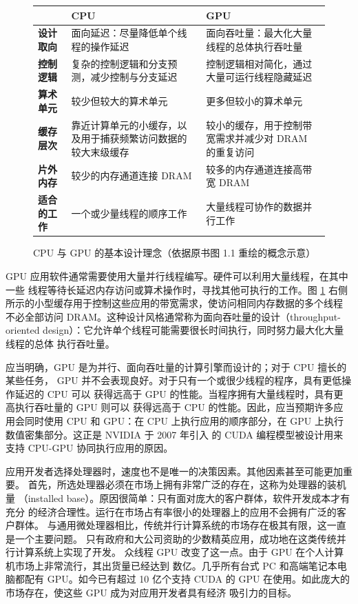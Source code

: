 \begin{figure}[htbp]
  \centering
  \small
  \renewcommand{\arraystretch}{1.35}
  \begin{tabularx}{0.95\textwidth}{%
    >{\raggedright\arraybackslash\bfseries}p{}
    >{\raggedright\arraybackslash}X
    >{\raggedright\arraybackslash}X}
    \toprule
    & CPU & GPU \\
    \midrule
    设计取向
      & 面向延迟：尽量降低单个线程的操作延迟
      & 面向吞吐量：最大化大量线程的总体执行吞吐量 \\
    控制逻辑
      & 复杂的控制逻辑和分支预测，减少控制与分支延迟
      & 控制逻辑相对简化，通过大量可运行线程隐藏延迟 \\
    算术单元
      & 较少但较大的算术单元
      & 更多但较小的算术单元 \\
    缓存层次
      & 靠近计算单元的小缓存，以及用于捕获频繁访问数据的较大末级缓存
      & 较小的缓存，用于控制带宽需求并减少对 DRAM 的重复访问 \\
    片外内存
      & 较少的内存通道连接 DRAM
      & 较多的内存通道连接高带宽 DRAM \\
    适合的工作
      & 一个或少量线程的顺序工作
      & 大量线程可协作的数据并行工作 \\
    \bottomrule
  \end{tabularx}
  \caption{CPU 与 GPU 的基本设计理念（依据原书图 1.1 重绘的概念示意）}
  \label{fig:1-1}
\end{figure}

GPU 应用软件通常需要使用大量并行线程编写。硬件可以利用大量线程，在其中一些
线程等待长延迟内存访问或算术操作时，寻找其他可执行的工作。图 \ref{fig:1-1}
右侧所示的小型缓存用于控制这些应用的带宽需求，使访问相同内存数据的多个线程
不必全部访问 DRAM。这种设计风格通常称为面向吞吐量的设计（throughput-oriented
design）：它允许单个线程可能需要很长时间执行，同时努力最大化大量线程的总体
执行吞吐量。

应当明确，GPU 是为并行、面向吞吐量的计算引擎而设计的；对于 CPU 擅长的某些任务，
GPU 并不会表现良好。对于只有一个或很少线程的程序，具有更低操作延迟的 CPU 可以
获得远高于 GPU 的性能。当程序拥有大量线程时，具有更高执行吞吐量的 GPU 则可以
获得远高于 CPU 的性能。因此，应当预期许多应用会同时使用 CPU 和 GPU：在 CPU
上执行应用的顺序部分，在 GPU 上执行数值密集部分。这正是 NVIDIA 于 2007 年引入
的 CUDA 编程模型被设计用来支持 CPU-GPU 协同执行应用的原因。

应用开发者选择处理器时，速度也不是唯一的决策因素。其他因素甚至可能更加重要。
首先，所选处理器必须在市场上拥有非常广泛的存在，这称为处理器的装机量
（installed base）。原因很简单：只有面对庞大的客户群体，软件开发成本才有充分
的经济合理性。运行在市场占有率很小的处理器上的应用不会拥有广泛的客户群体。
与通用微处理器相比，传统并行计算系统的市场存在极其有限，这一直是一个主要问题。
只有政府和大公司资助的少数精英应用，成功地在这类传统并行计算系统上实现了开发。
众线程 GPU 改变了这一点。由于 GPU 在个人计算机市场上非常流行，其出货量已经达到
数亿。几乎所有台式 PC 和高端笔记本电脑都配有 GPU。如今已有超过 10 亿个支持
CUDA 的 GPU 在使用。如此庞大的市场存在，使这些 GPU 成为对应用开发者具有经济
吸引力的目标。

